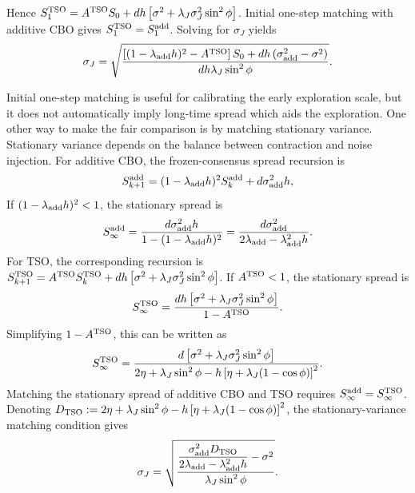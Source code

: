 \documentclass{article}
\numberwithin{equation}{section}
\begin{document}
Hence $S_1^{\rm TSO}
    =  A^{\rm TSO}S_0
    +  dh
    \left[\sigma^2
        + \lambda_J\sigma_J^2\sin^2\phi
    \right]$. 
Initial one-step matching with additive CBO gives $S_1^{\rm TSO} = S_1^{\rm add}$. 
Solving for \(\sigma_J\) yields
\begin{align}
    \sigma_J
    =\sqrt{\frac{\left[(1-\lambda_{\rm add} h)^2-A^{\rm TSO}\right]S_0+ dh\left(\sigma_{\rm add}^2-\sigma^2\right) }{dh\lambda_J\sin^2\phi} }.
\end{align}

Initial one-step matching is useful for calibrating the early exploration scale, but it does not automatically imply long-time spread which aids the exploration. One other way to make the fair comparison is by matching stationary variance.  Stationary variance depends on the balance between contraction and noise injection. For additive CBO, the frozen-consensus spread recursion is
\begin{align}
    S_{k+1}^{\rm add} =
    (1-\lambda_{\rm add} h)^2S_k^{\rm add} +
    d\sigma_{\rm add}^2h,
\end{align}    
If \((1-\lambda_{\rm add} h)^2<1\), the stationary spread is
\begin{align}
    S_\infty^{\rm add}
 = \frac{d\sigma_{\rm add}^2h}{ 1-(1-\lambda_{\rm add} h)^2 } = \frac{ d\sigma_{\rm add}^2}{        2\lambda_{\rm add}-\lambda_{\rm add}^2h  } .
\end{align}
For TSO, the corresponding recursion is $  S_{k+1}^{\rm TSO} =
    A^{\rm TSO}S_k^{\rm TSO}
    +  dh\left[
        \sigma^2
        + \lambda_J\sigma_J^2\sin^2\phi
    \right]$. If \(A^{\rm TSO}<1\), the stationary spread is
\[
    S_\infty^{\rm TSO}
    =
    \frac{dh\left[\sigma^2
+\lambda_J\sigma_J^2\sin^2\phi
        \right]}{1-A^{\rm TSO}}.
\]
Simplifying \(1-A^{\rm TSO}\), this can be written as
\begin{equation}
    S_\infty^{\rm TSO}
    =
    \frac{
        d
        \left[
            \sigma^2 +            \lambda_J\sigma_J^2\sin^2\phi
        \right]
    }{  2\eta+\lambda_J\sin^2\phi - h\left[
            \eta+\lambda_J(1-\cos\phi)
        \right]^2 }.
\end{equation}
Matching the stationary spread of additive CBO and TSO requires $ S_\infty^{\rm add}
    =
    S_\infty^{\rm TSO}$.
Denoting $D_{\rm TSO}
    := 2\eta
    + \lambda_J \sin^2\phi
    - h\left[\eta+ \lambda_J(1-\cos\phi)
    \right]^2$, the stationary-variance matching condition gives
\begin{equation}\label{tso_eqn_6.14}
    \sigma_J
    = \sqrt{\frac{\dfrac{\sigma_{\rm add}^2 D_{\rm TSO}}
            {2\lambda_{\rm add}-\lambda^2_{\rm add} h}-\sigma^2}{\lambda_J \sin^2\phi}}.
\end{equation}
\end{document}
